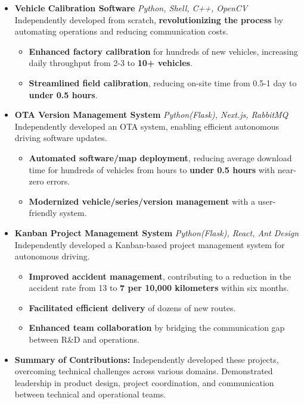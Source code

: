 \documentclass[11pt,a4paper]{moderncv}
\begin{document}
{
  \begin{itemize}
    \item \textbf{Vehicle Calibration Software} \textit{Python, Shell, C++, OpenCV}
        \newline
        Independently developed from scratch, \textbf{revolutionizing the process} by automating operations and reducing communication costs.
        \begin{itemize}
            \item \textbf{Enhanced factory calibration} for hundreds of new vehicles, increasing daily throughput from 2-3 to \textbf{10+ vehicles}.
            \item \textbf{Streamlined field calibration}, reducing on-site time from 0.5-1 day to \textbf{under 0.5 hours}.
        \end{itemize}
    \item \textbf{OTA Version Management System} \textit{Python(Flask), Next.js, RabbitMQ}
        \newline
        Independently developed an OTA system, enabling efficient autonomous driving software updates.
        \begin{itemize}
            \item \textbf{Automated software/map deployment}, reducing average download time for hundreds of vehicles from hours to \textbf{under 0.5 hours} with near-zero errors.
            \item \textbf{Modernized vehicle/series/version management} with a user-friendly system.
        \end{itemize}
    \item \textbf{Kanban Project Management System} \textit{Python(Flask), React, Ant Design}
        \newline
        Independently developed a Kanban-based project management system for autonomous driving.
        \begin{itemize}
            \item \textbf{Improved accident management}, contributing to a reduction in the accident rate from 13 to \textbf{7 per 10,000 kilometers} within six months.
            \item \textbf{Facilitated efficient delivery} of dozens of new routes.
            \item \textbf{Enhanced team collaboration} by bridging the communication gap between R\&D and operations.
        \end{itemize}
    \item \textbf{Summary of Contributions:} Independently developed these projects, overcoming technical challenges across various domains. Demonstrated leadership in product design, project coordination, and communication between technical and operational teams.
  \end{itemize}
}
\end{document}
